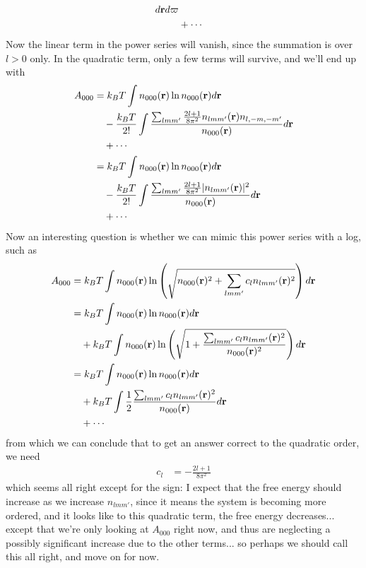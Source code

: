 \documentclass[letterpaper,twocolumn,amsmath,amssymb,pre]{revtex4-1}
\begin{document}
\begin{widetext}
\begin{align}
  d\mathbf{r} d\mathbf{\varpi}
  \\&+\cdots
\end{align}
Now the linear term in the power series will vanish, since the
summation is over $l>0$ only.  In the quadratic term, only a few terms
will survive, and we'll end up with
\begin{align}
  A_{000}
  &=
  k_BT\int
  n_{000}(\mathbf{r})\ln n_{000}(\mathbf{r})d\mathbf{r}
  \\&\quad-\frac{k_BT}{2!}\int
  \frac{\sum_{lmm'} \frac{2l+1}{8\pi^2} n_{lmm'}(\mathbf{r})n_{l,-m,-m'}}{n_{000}(\mathbf{r})}
  d\mathbf{r}
  \\&\quad+\cdots
  \\
  &=
  k_BT\int
  n_{000}(\mathbf{r})\ln n_{000}(\mathbf{r})d\mathbf{r}
  \\&\quad-\frac{k_BT}{2!}\int
  \frac{\sum_{lmm'} \frac{2l+1}{8\pi^2} |n_{lmm'}(\mathbf{r})|^2}{n_{000}(\mathbf{r})}
  d\mathbf{r}
  \\&\quad+\cdots
\end{align}
Now an interesting question is whether we can mimic this power series
with a log, such as
\begin{align}
  A_{000}
  &=
  k_BT\int
  n_{000}(\mathbf{r})\ln \left( \sqrt{n_{000}(\mathbf{r})^2 + \sum_{lmm'}
    c_ln_{lmm'}(\mathbf{r})^2} \right)d\mathbf{r}
  \\
  &= 
  k_BT\int
  n_{000}(\mathbf{r})\ln n_{000}(\mathbf{r})d\mathbf{r}
  \\&\quad+
  k_BT\int n_{000}(\mathbf{r})\ln\left( \sqrt{1 + \frac{\sum_{lmm'}
    c_ln_{lmm'}(\mathbf{r})^2}{n_{000}(\mathbf{r})^2}} \right)d\mathbf{r}
  \\
  &=
  k_BT\int
  n_{000}(\mathbf{r})\ln n_{000}(\mathbf{r})d\mathbf{r}
  \\&\quad+
  k_BT\int \frac12 \frac{\sum_{lmm'}
    c_ln_{lmm'}(\mathbf{r})^2}{n_{000}(\mathbf{r})} d\mathbf{r}
  \\&\quad+\cdots
\end{align}
from which we can conclude that to get an answer correct to the
quadratic order, we need
\begin{align}
  c_l &= -\frac{2l+1}{8\pi^2}
\end{align}
which seems all right except for the sign:  I expect that the free
energy should increase as we increase $n_{lmm'}$, since it means the
system is becoming more ordered, and it looks like to this quadratic
term, the free energy decreases... except that we're only looking at
$A_{000}$ right now, and thus are neglecting a possibly significant
increase due to the other terms...  so perhaps we should call this all
right, and move on for now.


\end{widetext}
\end{document}
